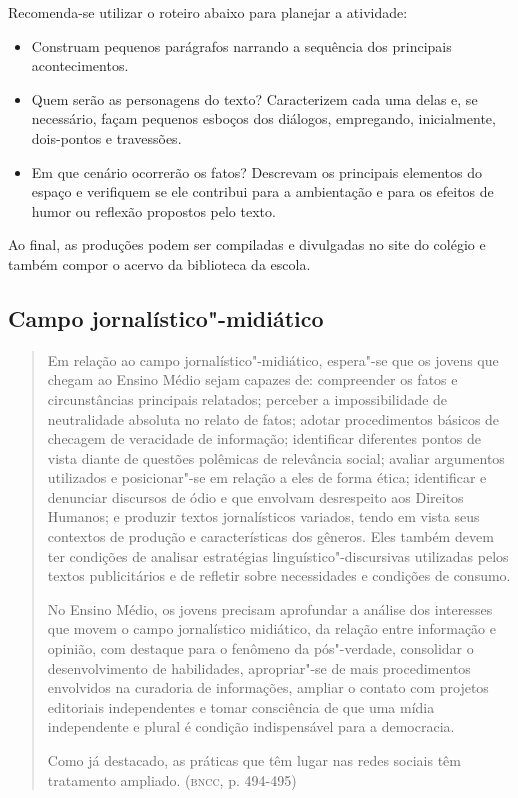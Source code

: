 \documentclass{extarticle}
\begin{document}
Recomenda-se utilizar o roteiro abaixo para planejar a atividade:

\begin{itemize}
\item
Construam pequenos parágrafos narrando a sequência dos principais
acontecimentos.
\item
Quem serão as personagens do texto? Caracterizem cada uma delas e, se
necessário, façam pequenos esboços dos diálogos, empregando,
inicialmente, dois-pontos e travessões.
\item
Em que cenário ocorrerão os fatos? Descrevam os principais elementos
do espaço e verifiquem se ele contribui para a ambientação e para os
efeitos de humor ou reflexão propostos pelo texto.
\end{itemize}

Ao final, as produções podem ser compiladas e divulgadas no site do
colégio e também compor o acervo da biblioteca da escola.

\subsection{Campo jornalístico"-midiático}

\begin{quote}
Em relação ao campo jornalístico"-midiático, espera"-se que os jovens
que chegam ao Ensino Médio sejam capazes de: compreender os fatos e
circunstâncias principais relatados; perceber a impossibilidade de
neutralidade absoluta no relato de fatos; adotar procedimentos básicos
de checagem de veracidade de informação; identificar diferentes pontos
de vista diante de questões polêmicas de relevância social; avaliar
argumentos utilizados e posicionar"-se em relação a eles de forma ética;
identificar e denunciar discursos de ódio e que envolvam desrespeito aos
Direitos Humanos; e produzir textos jornalísticos variados, tendo em
vista seus contextos de produção e características dos gêneros. Eles
também devem ter condições de analisar estratégias
linguístico"-discursivas utilizadas pelos textos publicitários e de
refletir sobre necessidades e condições de consumo.

No Ensino Médio, os jovens precisam aprofundar a análise dos interesses
que movem o campo jornalístico midiático, da relação entre informação e
opinião, com destaque para o fenômeno da pós"-verdade, consolidar o
desenvolvimento de habilidades, apropriar"-se de mais procedimentos
envolvidos na curadoria de informações, ampliar o contato com projetos
editoriais independentes e tomar consciência de que uma mídia
independente e plural é condição indispensável para a democracia.

Como já destacado, as práticas que têm lugar nas redes sociais têm
tratamento ampliado. (\textsc{bncc}, p. 494-495)
\end{quote}
\end{document}
